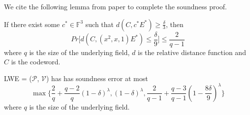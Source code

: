We cite the following lemma from paper \cite{lwe} to complete the soundness proof.

\begin{lemma}
\label{lemma:lweseproof}

If there exist some $c^* \in \mathbb{F}^3$ such that $d(C, c^*E^*) \ge \frac{\delta}{3}$, then
$$
    Pr\biggl[ d(C, (x^2, x, 1)E^*) \le \frac{\delta}{9} \biggr] \le \frac{2}{q-1}
$$
where $q$ is the size of the underlying field, $d$ is the relative distance function and $C$ is the codeword.

\end{lemma}

\begin{lemma}
\label{lemma:lwese}

LWE = ($\mathcal{P}$, $\mathcal{V}$) has has soundness error at most 
$$
    \max
    \biggl\{
    \frac{2}{q} + \frac{q-2}{q}(1 - \delta)^\lambda, 
    (1 - \delta)^\lambda, 
    \frac{2}{q-1} + \frac{q-3}{q-1}(1 - \frac{8\delta}{9})^\lambda
    \biggr\}
$$
where $q$ is the size of the underlying field.

\end{lemma}
